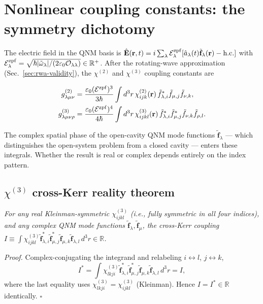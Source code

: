 \documentclass[11pt]{article}
\newcommand{\zpf}{{\rm zpf}}
\newcommand{\tf}{\tilde{\mathbf{f}}}
\newcommand{\tomega}{\tilde{\omega}}
\newcommand{\calO}{\mathcal{O}}
\begin{document}
\section{Nonlinear coupling constants: the symmetry dichotomy}
\label{sec:nonlinear}

The electric field in the QNM basis is
$\hat{\mathbf{E}}(\mathbf{r},t)=i\sum_\lambda\mathcal{E}_\lambda^\zpf
[\hat a_\lambda(t)\tf_\lambda(\mathbf{r})-\mathrm{h.c.}]$ with
$\mathcal{E}_\lambda^\zpf=\sqrt{\hbar|\tomega_\lambda|/(2\varepsilon_0
\calO_{\lambda\lambda})}\in\mathbb{R}^+$.  After the rotating-wave
approximation (Sec.~\ref{sec:rwa-validity}), the $\chi^{(2)}$ and
$\chi^{(3)}$ coupling constants are
\begin{keyresult}
\begin{align}
  g^{(2)}_{\lambda\mu\nu} &=
  \frac{\varepsilon_0(\mathcal{E}^\zpf)^3}{3\hbar}
  \int d^3r\,\chi^{(2)}_{ijk}(\mathbf{r})\,
  \tilde{f}_{\lambda,i}^*\tilde{f}_{\mu,j}\tilde{f}_{\nu,k},
  \label{eq:g2}\\
  g^{(3)}_{\lambda\mu\nu\rho} &=
  \frac{\varepsilon_0(\mathcal{E}^\zpf)^4}{4\hbar}
  \int d^3r\,\chi^{(3)}_{ijkl}(\mathbf{r})\,
  \tilde{f}_{\lambda,i}^*\tilde{f}_{\mu,j}^*\tilde{f}_{\nu,k}\tilde{f}_{\rho,l}.
  \label{eq:g3}
\end{align}
\end{keyresult}
The complex spatial phase of the open-cavity QNM mode functions
$\tf_\lambda$ --- which distinguishes the open-system problem from a
closed cavity --- enters these integrals.  Whether the result is real
or complex depends entirely on the index pattern.

\subsection{$\chi^{(3)}$ cross-Kerr reality theorem}
\label{sec:xk-real}

\begin{remark}
\textit{For any real Kleinman-symmetric
$\chi^{(3)}_{ijkl}$ (i.e., fully symmetric in all four indices), and
any complex QNM mode functions $\tf_\lambda,\tf_\mu$, the cross-Kerr
coupling
\(I\equiv\int\chi^{(3)}_{ijkl}\tf^*_{\lambda,i}\tf^*_{\mu,j}
\tf_{\mu,k}\tf_{\lambda,l}\,d^3r\in\mathbb{R}\).}
\end{remark}

\textit{Proof.}  Complex-conjugating the integrand and relabeling
$i\leftrightarrow l$, $j\leftrightarrow k$,
\begin{equation}
  I^* = \int\chi^{(3)}_{lkji}\tf^*_{\lambda,i}\tf^*_{\mu,j}
  \tf_{\mu,k}\tf_{\lambda,l}\,d^3r = I,
  \label{eq:kleinman_proof}
\end{equation}
where the last equality uses
$\chi^{(3)}_{lkji}=\chi^{(3)}_{ijkl}$ (Kleinman).  Hence
$I=I^*\in\mathbb{R}$ identically. $\square$
\end{document}
